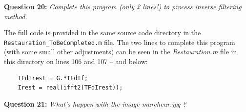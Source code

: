 \textbf{Question 20:}
\textit{Complete this program (only 2 lines!) to process inverse ﬁltering method.}

The full code is provided in the same source code directory in the \texttt{Restauration\_ToBeCompleted.m} file. 
The two lines to complete this program (with some small other adjustments) can be seen in the \textit{Restauration.m} file in this directory on lines 106 and 107 -- and below:
\begin{lstlisting}
    TFdIrest = G.*TFdIf;
    Irest = real(ifft2(TFdIrest));
\end{lstlisting}


\textbf{Question 21:}
\textit{What’s happen with the image marcheur.jpg ?}






